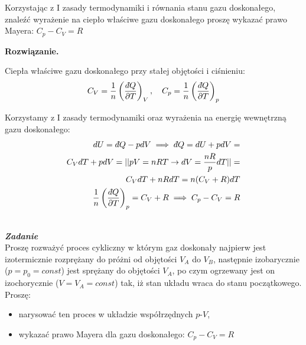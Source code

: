 \documentclass[11pt,a4paper]{article}
\newcommand{\dbar} {\ensuremath{\,\mathchar'26\mkern-12mu d}}
\newcounter{zadanie}\newcommand{\zadanie}[1][]{\addtocounter{zadanie}{1} ~\\ {\bf \emph{Zadanie \arabic{zadanie} #1 }} \\}
\newenvironment{solution}{\vspace{1cm} \par\textbf{Rozwiązanie.} \vspace{1cm}}{}
\begin{document}
Korzystając z I zasady termodynamiki i równania stanu gazu 
doskonałego, znaleźć wyrażenie na ciepło właściwe gazu 
doskonałego proszę wykazać prawo Mayera: 
$C_p - C_V = R$ 

\begin{solution}

Ciepła właściwe gazu doskonałego przy stałej objętości i ciśnieniu:
\begin{align*}
  C_V = \frac{1}{n}\left( \frac{\dbar Q}{\partial T} \right)_{V}, \quad 
  C_p = \frac{1}{n}\left( \frac{\dbar Q}{\partial T} \right)_{p}
\end{align*}  

Korzystamy z I zasady termodynamiki oraz wyrażenia na energię wewnętrzną 
gazu doskonałego:
\begin{align*}
  dU = \dbar Q - pdV \implies \dbar Q = dU + pdV = \\
        C_V dT + pdV = || pV = nRT \to dV = \frac{nR}{p} dT || = \\
        C_V dT + nR dT = n(C_V + R) dT \\
        \frac{1}{n}\left( \frac{\dbar Q}{\partial T} \right)_{p} = C_V + R \implies C_p - C_V = R
\end{align*}

\newpage
\end{solution}
\zadanie[]

Proszę rozważyć proces cykliczny w którym gaz doskonały najpierw jest izotermicznie rozprężany 
do próżni od objętości $V_A$ do $V_B$, 
następnie izobarycznie ($p=p_0=const$) jest sprężany do objętości $V_A$, 
po czym ogrzewany jest on izochorycznie ($V=V_A=const$) tak, 
iż stan układu wraca do stanu początkowego. Proszę:
\begin{itemize}
  \item narysować ten proces w układzie współrzędnych $p$-$V$,
  \item wykazać prawo Mayera dla gazu doskonałego: $C_p - C_V = R$ 
\end{itemize}
\end{document}
